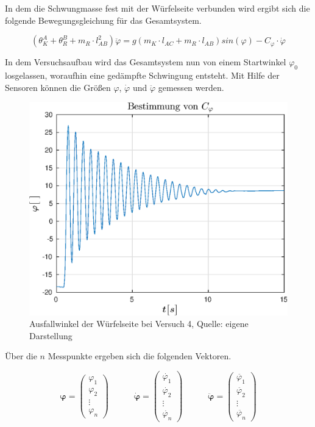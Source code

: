In dem die Schwungmasse fest mit der Würfelseite verbunden wird ergibt sich die folgende Bewegungsgleichung für das Gesamtsystem.

\begin{equation}
\label{ermittlung_c_phi_equation}
(\theta^A_K + \theta^B_R + m_R  \cdot l_{AB}^2) \ddot{\varphi} = g(m_K \cdot l_{AC} + m_R \cdot l_{AB})sin(\varphi) - C_{\varphi} \cdot \dot{\varphi}
\end{equation}

In dem Versuchsaufbau wird das Gesamtsystem nun von einem Startwinkel $\varphi_0$ losgelassen, woraufhin eine gedämpfte Schwingung entsteht. Mit Hilfe der Sensoren können die Größen $\varphi$, $\dot{\varphi}$ und $\ddot{\varphi}$ gemessen werden.

\begin{figure}[h!]
\centering
 \includegraphics[width=0.5\linewidth]{img/C_phi.eps}
	\caption{Ausfallwinkel der Würfelseite bei Versuch 4, Quelle: eigene Darstellung}
\end{figure}

Über die $n$ Messpunkte ergeben sich die folgenden Vektoren.

\begin{equation}
\boldsymbol{\varphi} = \begin{pmatrix} \varphi_1 \\ \varphi_2 \\ \vdots \\ \varphi_n \end{pmatrix} \hspace{35pt}
\boldsymbol{\dot{\varphi}} = \begin{pmatrix}
\dot{\varphi_1} \\ \dot{\varphi_2} \\ \vdots \\ \dot{\varphi_n}
\end{pmatrix} \hspace{35pt}
\boldsymbol{\ddot{\varphi}} = \begin{pmatrix}
\ddot{\varphi_1} \\ \ddot{\varphi_2} \\ \vdots \\ \ddot{\varphi_n}
\end{pmatrix}
\end{equation}


